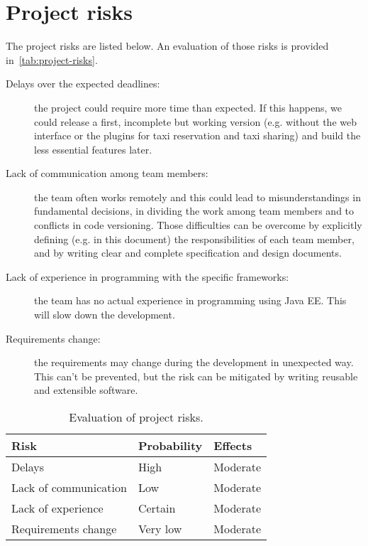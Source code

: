 \section{Project risks}

The project risks are listed below. An evaluation of those risks is provided in~\autoref{tab:project-risks}.

\begin{description}
    \item[Delays over the expected deadlines:] the project could require more time than expected. If this happens, we could release a first, incomplete but working version (e.g. without the web interface or the plugins for taxi reservation and taxi sharing) and build the less essential features later.

    \item[Lack of communication among team members:] the team often works remotely and this could lead to misunderstandings in fundamental decisions, in dividing the work among team members and to conflicts in code versioning. Those difficulties can be overcome by explicitly defining (e.g. in this document) the responsibilities of each team member, and by writing clear and complete specification and design documents.

    \item[Lack of experience in programming with the specific frameworks:] the team has no actual experience in programming using Java EE. This will slow down the development.

    \item[Requirements change:] the requirements may change during the development in unexpected way. This can't be prevented, but the risk can be mitigated by writing reusable and extensible software.
\end{description}

\begin{table}[p]
\centering
    \begin{tabular}{| l | l | l |}
        \hline
        \textbf{Risk}           & \textbf{Probability}  & \textbf{Effects}  \\
        \hline
        Delays                  & High                  & Moderate          \\
        \hline
        Lack of communication   & Low                   & Moderate          \\
        \hline
        Lack of experience      & Certain               & Moderate          \\
        \hline
        Requirements change     & Very low              & Moderate          \\
        \hline
    \end{tabular}
    \caption{Evaluation of project risks.}
    \label{tab:project-risks}
\end{table}
